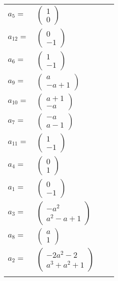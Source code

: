 \documentclass[1p]{elsarticle_modified}
\theoremstyle{definition}
\begin{document}
\begin{tabular}{m{7pt} m{180pt} m{7pt} m{180pt} }
\flushright $a_{5}=$&$\begin{pmatrix}1\\0\end{pmatrix}$ \\
\flushright $a_{12}=$&$\begin{pmatrix}0\\-1\end{pmatrix}$ \\
\flushright $a_{6}=$&$\begin{pmatrix}1\\-1\end{pmatrix}$ \\
\flushright $a_{9}=$&$\begin{pmatrix}a\\- a+1\end{pmatrix}$ \\
\flushright $a_{10}=$&$\begin{pmatrix}a+1\\- a\end{pmatrix}$ \\
\flushright $a_{7}=$&$\begin{pmatrix}- a\\a-1\end{pmatrix}$ \\
\flushright $a_{11}=$&$\begin{pmatrix}1\\-1\end{pmatrix}$ \\
\flushright $a_{4}=$&$\begin{pmatrix}0\\1\end{pmatrix}$ \\
\flushright $a_{1}=$&$\begin{pmatrix}0\\-1\end{pmatrix}$ \\
\flushright $a_{3}=$&$\begin{pmatrix}- a^2\\a^2- a+1\end{pmatrix}$ \\
\flushright $a_{8}=$&$\begin{pmatrix}a\\1\end{pmatrix}$ \\
\flushright $a_{2}=$&$\begin{pmatrix}-2 a^2-2\\a^3+a^2+1\end{pmatrix}$\\&\end{tabular}
\end{document}

